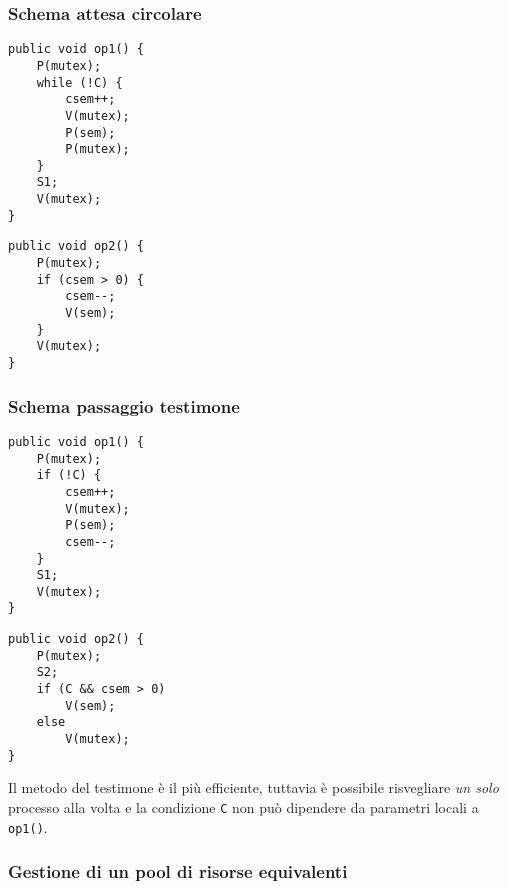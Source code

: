 \subsubsection{Schema attesa circolare}
\vspace{-0.5cm}
\begin{multicols}{2}
    \begin{verbatim}
public void op1() {
    P(mutex);
    while (!C) {
        csem++;
        V(mutex);
        P(sem);
        P(mutex);
    }
    S1;
    V(mutex);
}
    \end{verbatim}
    \columnbreak
    \begin{verbatim}
public void op2() {
    P(mutex);
    if (csem > 0) {
        csem--;
        V(sem);
    }
    V(mutex);
}
    \end{verbatim}
\end{multicols}

\subsubsection{Schema passaggio testimone}

\begin{multicols}{2}
    \begin{verbatim}
public void op1() {
    P(mutex);
    if (!C) {
        csem++;
        V(mutex);
        P(sem);
        csem--;
    }
    S1;
    V(mutex);
}
    \end{verbatim}
    \columnbreak
    \begin{verbatim}
public void op2() {
    P(mutex);
    S2;
    if (C && csem > 0)
        V(sem);
    else
        V(mutex);
}
    \end{verbatim}
\end{multicols}

Il metodo del testimone è il più efficiente, tuttavia è possibile risvegliare \textit{un solo} processo alla volta e la condizione \texttt{C} non può dipendere da parametri locali a \texttt{op1()}.

\subsubsection{Gestione di un pool di risorse equivalenti}

